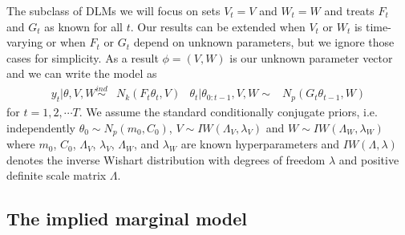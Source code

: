 \documentclass[12pt]{article}
\begin{document}
The subclass of DLMs we will focus on sets $V_t=V$ and $W_t=W$ and treats $F_{t}$ and $G_{t}$ as known for all $t$. Our results can be extended when $V_t$ or $W_t$ is time-varying or when $F_t$ or $G_t$ depend on unknown parameters, but we ignore those cases for simplicity. As a result $\phi=(V,W)$ is our unknown parameter vector and we can write the model as
\begin{align}
  y_t|\theta,V,W \stackrel{ind}{\sim} & N_k(F_t\theta_t,V) &
  \theta_t|\theta_{0:t-1},V,W  \sim & N_p(G_t\theta_{t-1},W) \label{dlmbotheqs}
\end{align}
for $t=1,2,\cdots T$. We assume the standard conditionally conjugate priors, i.e. independently $\theta_0 \sim N_p(m_0, C_0)$, $V \sim IW(\Lambda_V, \lambda_V)$ and $W \sim IW(\Lambda_W, \lambda_W)$ where $m_0$, $C_0$, $\Lambda_V$, $\lambda_V$, $\Lambda_W$, and $\lambda_W$ are known hyperparameters and $IW(\Lambda, \lambda)$ denotes the inverse Wishart distribution with degrees of freedom $\lambda$ and positive definite scale matrix $\Lambda$.

\subsection{The implied marginal model}\label{sec:DLM:marg}
\end{document}
